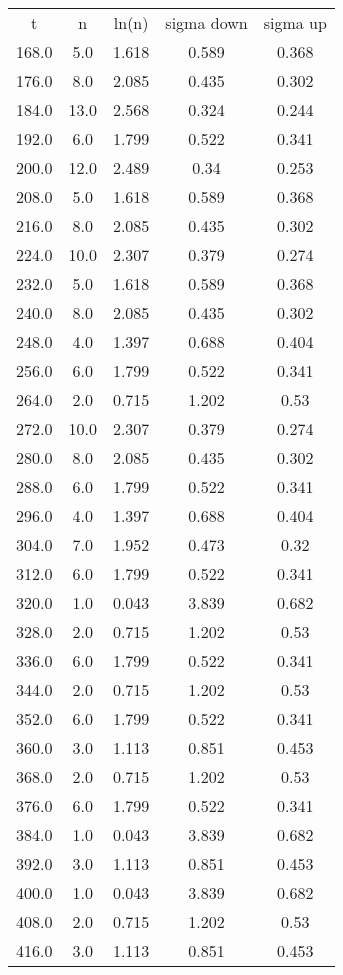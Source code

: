 \begin{table}
\begin{tabular}{ccccc}
t & n & ln(n) & sigma down & sigma up \\
168.0 & 5.0 & 1.618 & 0.589 & 0.368 \\
176.0 & 8.0 & 2.085 & 0.435 & 0.302 \\
184.0 & 13.0 & 2.568 & 0.324 & 0.244 \\
192.0 & 6.0 & 1.799 & 0.522 & 0.341 \\
200.0 & 12.0 & 2.489 & 0.34 & 0.253 \\
208.0 & 5.0 & 1.618 & 0.589 & 0.368 \\
216.0 & 8.0 & 2.085 & 0.435 & 0.302 \\
224.0 & 10.0 & 2.307 & 0.379 & 0.274 \\
232.0 & 5.0 & 1.618 & 0.589 & 0.368 \\
240.0 & 8.0 & 2.085 & 0.435 & 0.302 \\
248.0 & 4.0 & 1.397 & 0.688 & 0.404 \\
256.0 & 6.0 & 1.799 & 0.522 & 0.341 \\
264.0 & 2.0 & 0.715 & 1.202 & 0.53 \\
272.0 & 10.0 & 2.307 & 0.379 & 0.274 \\
280.0 & 8.0 & 2.085 & 0.435 & 0.302 \\
288.0 & 6.0 & 1.799 & 0.522 & 0.341 \\
296.0 & 4.0 & 1.397 & 0.688 & 0.404 \\
304.0 & 7.0 & 1.952 & 0.473 & 0.32 \\
312.0 & 6.0 & 1.799 & 0.522 & 0.341 \\
320.0 & 1.0 & 0.043 & 3.839 & 0.682 \\
328.0 & 2.0 & 0.715 & 1.202 & 0.53 \\
336.0 & 6.0 & 1.799 & 0.522 & 0.341 \\
344.0 & 2.0 & 0.715 & 1.202 & 0.53 \\
352.0 & 6.0 & 1.799 & 0.522 & 0.341 \\
360.0 & 3.0 & 1.113 & 0.851 & 0.453 \\
368.0 & 2.0 & 0.715 & 1.202 & 0.53 \\
376.0 & 6.0 & 1.799 & 0.522 & 0.341 \\
384.0 & 1.0 & 0.043 & 3.839 & 0.682 \\
392.0 & 3.0 & 1.113 & 0.851 & 0.453 \\
400.0 & 1.0 & 0.043 & 3.839 & 0.682 \\
408.0 & 2.0 & 0.715 & 1.202 & 0.53 \\
416.0 & 3.0 & 1.113 & 0.851 & 0.453 \\
\end{tabular}
\end{table}
